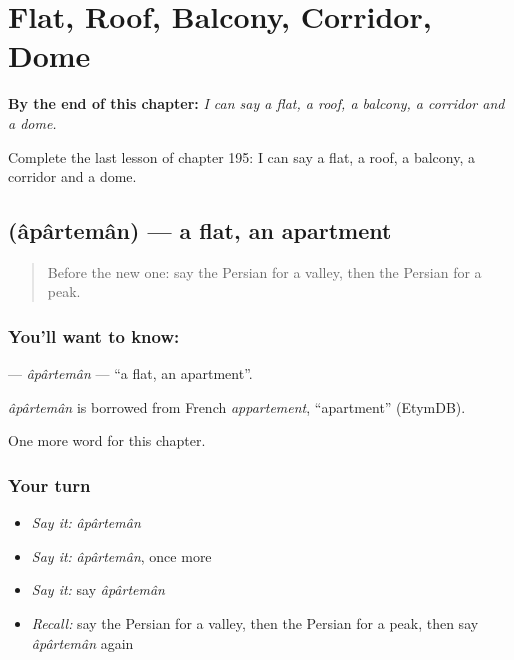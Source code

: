 
\chapter{Flat, Roof, Balcony, Corridor, Dome}
\label{ch:fa-flat-roof-balcony-corridor-dome}

\begin{chapteropening}
\textbf{By the end of this chapter:} \emph{I can say a flat, a roof, a balcony, a corridor and a dome.}

Complete the last lesson of chapter 195: I can say a flat, a roof, a balcony, a corridor and a dome.
\end{chapteropening}

\section[\texorpdfstring{\fa{آپارتمان} (âpârtemân)}{آپارتمان (âpârtemân)}]{ (âpârtemân) — a flat, an apartment}

\label{lesson:FA-C195-aparteman}



\begin{quote}
Before the new one: say the Persian for a valley, then the Persian for a peak.
\end{quote}

\subsection*{You'll want to know: }
\textbf{} — \emph{âpârtemân} — \textquotedblleft{}a flat, an apartment\textquotedblright{}.

\begin{cousinweb}
\emph{âpârtemân} is borrowed from French \emph{appartement}, \textquotedblleft{}apartment\textquotedblright{} (EtymDB).
\end{cousinweb}

\begin{grammarlens}[title={What you've built}]
One more word for this chapter.
\end{grammarlens}

\subsection*{Your turn}
\begin{itemize}
\raggedright
  \item \emph{Say it:} \emph{âpârtemân}
  \item \emph{Say it:} \emph{âpârtemân}, once more
  \item \emph{Say it:} say \emph{âpârtemân}
  \item \emph{Recall:} say the Persian for a valley, then the Persian for a peak, then say \emph{âpârtemân} again
\end{itemize}

